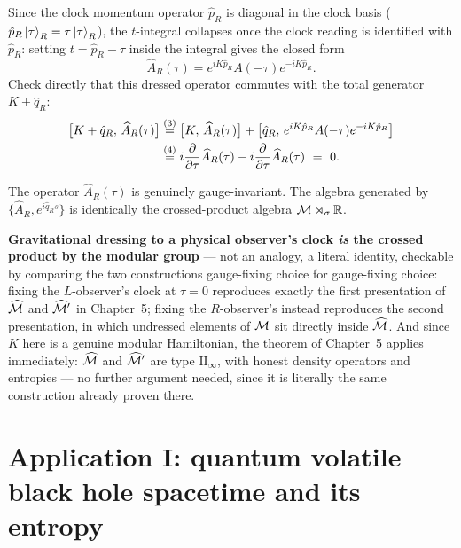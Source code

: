 Since the clock momentum operator $\hat p_R$ is diagonal in the clock basis ($\hat p_R \ket\tau_R = \tau
\ket\tau_R$), the $t$-integral collapses once the clock reading is identified with $\hat p_R$: setting
$t = \hat p_R - \tau$ inside the integral gives the closed form
\[
\widehat A_R(\tau) = e^{i K \hat p_R} A(-\tau) e^{-i K \hat p_R} .
\]
Check directly that this dressed operator commutes with the total generator $K + \hat q_R$:
\begin{align}
\big[K + \hat q_R,\, \widehat A_R(\tau)\big]
&\overset{(3)}{=} \big[K,\, \widehat A_R(\tau)\big] + \big[\hat q_R,\, e^{i K \hat p_R} A(-\tau) e^{-i K
\hat p_R}\big] \notag\\
&\overset{(4)}{=} i \frac{\partial}{\partial \tau}\widehat A_R(\tau) - i \frac{\partial}{\partial
\tau}\widehat A_R(\tau) \ =\ 0 . \notag
\end{align}
\quad
{}

The operator $\widehat A_R(\tau)$ is genuinely gauge-invariant. The algebra generated by $\{\widehat A_R,
e^{i\hat q_R s}\}$ is identically the crossed-product algebra $\mathcal{M} \rtimes_\sigma \mathbb{R}$.

\textbf{Gravitational dressing to a physical observer's clock \emph{is} the crossed product by the modular
group} — not an analogy, a literal identity, checkable by comparing the two constructions gauge-fixing choice
for gauge-fixing choice: fixing the $L$-observer's clock at $\tau=0$ reproduces exactly the first presentation
of $\widehat{\mathcal{M}}$ and $\widehat{\mathcal{M}}'$ in Chapter~5; fixing the $R$-observer's instead reproduces the second
presentation, in which undressed elements of $\mathcal{M}$ sit directly inside $\widehat{\mathcal{M}}$. And since $K$ here is a
genuine modular Hamiltonian, the theorem of Chapter~5 applies immediately: $\widehat{\mathcal{M}}$ and $\widehat{\mathcal{M}}'$ are
type $\mathrm{II}_\infty$, with honest density operators and entropies — no further argument needed, since
it is literally the same construction already proven there.

\section{Application I: quantum volatile black hole spacetime and its entropy}


